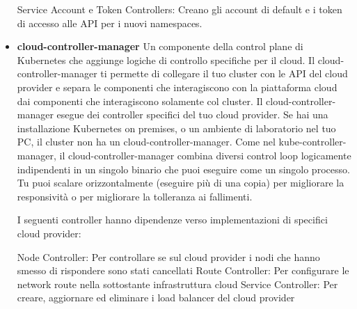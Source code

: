 \begin{itemize}
    Service Account e Token Controllers: Creano gli account di default e i token di accesso alle API per i nuovi namespaces.
    \item\textbf{cloud-controller-manager}
    Un componente della control plane di Kubernetes che aggiunge logiche di controllo specifiche per il cloud. Il cloud-controller-manager ti permette di collegare il tuo cluster con le API del cloud provider e separa le componenti che interagiscono con la piattaforma cloud dai componenti che interagiscono solamente col cluster.
    Il cloud-controller-manager esegue dei controller specifici del tuo cloud provider. Se hai una installazione Kubernetes on premises, o un ambiente di laboratorio nel tuo PC, il cluster non ha un cloud-controller-manager.
    Come nel kube-controller-manager, il cloud-controller-manager combina diversi control loop logicamente indipendenti in un singolo binario che puoi eseguire come un singolo processo. Tu puoi scalare orizzontalmente (eseguire più di una copia) per migliorare la responsività o per migliorare la tolleranza ai fallimenti.
    
    I seguenti controller hanno dipendenze verso implementazioni di specifici cloud provider:

    Node Controller: Per controllare se sul cloud provider i nodi che hanno smesso di rispondere sono stati cancellati
    Route Controller: Per configurare le network route nella sottostante infrastruttura cloud
    Service Controller: Per creare, aggiornare ed eliminare i load balancer del cloud provider

\end{itemize}